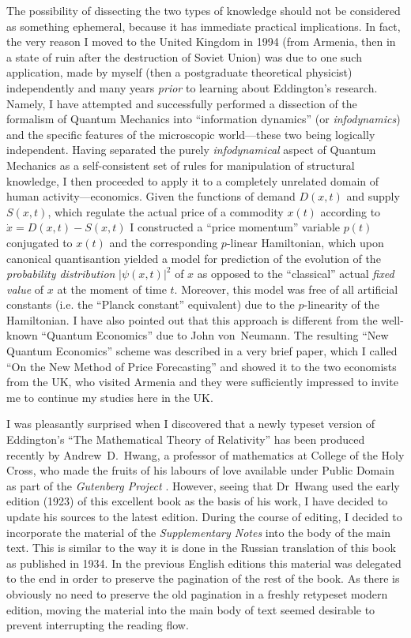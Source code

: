 \documentclass[12pt]{book}
\begin{document}
The possibility of dissecting the two types of knowledge should not be considered as something ephemeral, because it has immediate practical implications.
In fact, the very reason I moved to the United Kingdom in 1994 (from Armenia, then in a state of ruin after the destruction of Soviet Union) was due
to one such application, made by myself (then a postgraduate theoretical physicist) independently and many years \emph{prior} to learning about Eddington's research.
Namely, I have attempted and successfully performed a dissection of the formalism of Quantum Mechanics into ``information dynamics'' (or \emph{infodynamics}) and the specific features
of the microscopic world---these two being logically independent.
Having separated the purely \emph{infodynamical} aspect of Quantum Mechanics as a self\hyp{}consistent set of rules for manipulation of structural knowledge, I then proceeded
to apply it to a completely unrelated domain of human activity---economics.
Given the functions of demand $D(x,t)$ and supply $S(x,t)$, which regulate the actual price of a commodity $x(t)$ according to $\dot x = D(x,t) - S(x,t)$ I constructed
a ``price momentum'' variable $p(t)$ conjugated to $x(t)$ and the corresponding $p$-linear Hamiltonian, which upon canonical quantisantion yielded a model for prediction of the evolution
of the \emph{probability distribution} $|\psi(x,t)|^2$ of $x$ as opposed to the ``classical'' actual \emph{fixed value} of $x$ at the moment of time $t$.
Moreover, this model was free of all artificial constants (i.e. the ``Planck constant'' equivalent) due to the $p$-linearity of the Hamiltonian.
I have also pointed out that this approach is different from the well\hyp{}known ``Quantum Economics'' due to John von~Neumann.
The resulting ``New Quantum Economics'' scheme was described in a very brief paper, which I called ``On the New Method of Price Forecasting'' and showed it to the two economists from the UK,
who visited Armenia and they were sufficiently impressed to invite me to continue my studies here in the UK.


I was pleasantly surprised when I discovered that a newly typeset version of Eddington's
``The Mathematical Theory of Relativity'' has been produced recently by Andrew~D.~Hwang,
a professor of mathematics at College of the Holy Cross, who made the fruits of his labours of love
available under Public Domain as part of the \emph{Gutenberg Project} \cite{Hwang1}.
However, seeing that Dr~Hwang used the early edition (1923) of this excellent book as the basis of his work,
I have decided to update his sources to the latest edition.
During the course of editing, I decided to incorporate the material of the \emph{Supplementary Notes} into the
body of the main text.
This is similar to the way it is done in the Russian translation of this book as published in 1934.
In the previous English editions this material was delegated to the end in order to preserve the pagination
of the rest of the book.
As there is obviously no need to preserve the old pagination in a freshly retypeset modern edition,
moving the material into the main body of text seemed desirable to prevent interrupting the reading flow.
\end{document}
